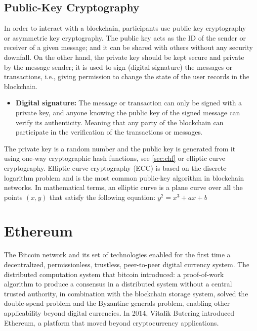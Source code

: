 \documentclass[11pt,a4paper]{report}
\begin{document}
\subsection{Public-Key Cryptography}\label{publickey}
In order to interact with a blockchain, participants use public key cryptography or asymmetric key cryptography\cite{book:pkc}. The public key acts as the ID of the sender or receiver of a given message; and it can be shared with others without any security downfall. On the other hand, the private key should be kept secure and private by the message sender; it is used to sign (digital signature) the messages or transactions, i.e., giving permission to change the state of the user records in the blockchain.
\begin{itemize}
	\item[] \textbf{Digital signature:} The message or transaction can only be signed with a private key, and anyone knowing the public key of the signed message can verify  its authenticity. Meaning that any party of the blockchain can participate in the verification of the transactions or messages.
\end{itemize}
The private key is a random number and the public key is generated from it using one-way cryptographic hash functions, see \ref{sec:chf} or elliptic curve cryptography\cite{book:pkc}\cite{wiki:ecc}. Elliptic curve cryptography (ECC) is based on the discrete logarithm problem and is the most common public-key algorithm in blockchain networks.
In mathematical terms, an elliptic curve is a plane curve over all the points $(x, y)$ that satisfy the following equation:  $ y^2 = x^3 +ax + b $


\section{Ethereum}\label{sec:eth}
The Bitcoin\cite{bitcoin}\cite{book:masteringBTC} network and its set of technologies enabled for the first time a decentralized, permissionless, trustless, peer-to-peer digital currency system. The distributed computation system that bitcoin introduced: a proof-of-work algorithm to produce a consensus in a distributed system without a central trusted authority, in combination with the blockchain storage system, solved the double-spend problem and the Byzantine generals problem, enabling other applicability beyond digital currencies.  In 2014, Vitalik Butering introduced Ethereum\cite{article:eth}, a platform that moved beyond cryptocurrency applications.
\end{document}

